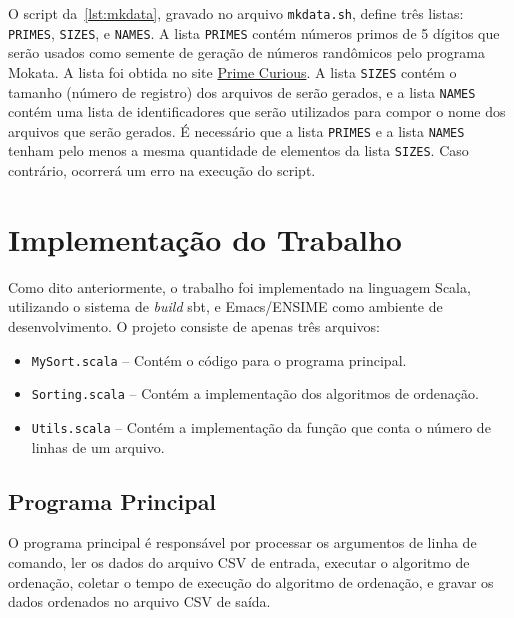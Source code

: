 \documentclass[a4paper,12pt]{scrartcl}
\begin{document}
O script da~\autoref{lst:mkdata}, gravado no arquivo \texttt{mkdata.sh}, define
três listas: \texttt{PRIMES}, \texttt{SIZES}, e \texttt{NAMES}. A lista
\texttt{PRIMES} contém números primos de 5 dígitos que serão usados como semente
de geração de números randômicos pelo programa \textsf{Mokata}. A lista foi
obtida no site
\href{https://primes.utm.edu/curios/index.php?start=5&stop=5}{Prime Curious}. A
lista \texttt{SIZES} contém o tamanho (número de registro) dos arquivos de serão
gerados, e a lista \texttt{NAMES} contém uma lista de identificadores que serão
utilizados para compor o nome dos arquivos que serão gerados. É necessário que a
lista \texttt{PRIMES} e a lista \texttt{NAMES} tenham pelo menos a mesma
quantidade de elementos da lista \texttt{SIZES}. Caso contrário, ocorrerá um
erro na execução do script.



\section{Implementação do Trabalho}

Como dito anteriormente, o trabalho foi implementado na linguagem Scala,
utilizando o sistema de \emph{build} sbt, e Emacs/ENSIME como ambiente de
desenvolvimento. O projeto consiste de apenas três arquivos:

\begin{itemize}
\item \texttt{MySort.scala} -- Contém o código para o programa principal.
\item \texttt{Sorting.scala} -- Contém a implementação dos algoritmos de
  ordenação.
\item \texttt{Utils.scala} -- Contém a implementação da função que conta o
  número de linhas de um arquivo.
\end{itemize}


\subsection{Programa Principal}

O programa principal é responsável por processar os argumentos de linha de
comando, ler os dados do arquivo CSV de entrada, executar o algoritmo de
ordenação, coletar o tempo de execução do algoritmo de ordenação, e gravar os
dados ordenados no arquivo CSV de saída. 
\end{document}
